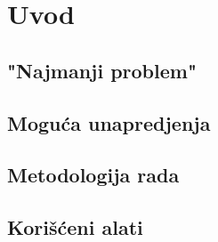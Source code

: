 \documentclass{article}
\begin{document}

\section{Uvod}


\subsection{"Najmanji problem"}


\subsection{Moguća unapredjenja}


\subsection{Metodologija rada}


\subsection{Korišćeni alati}

\end{document}
